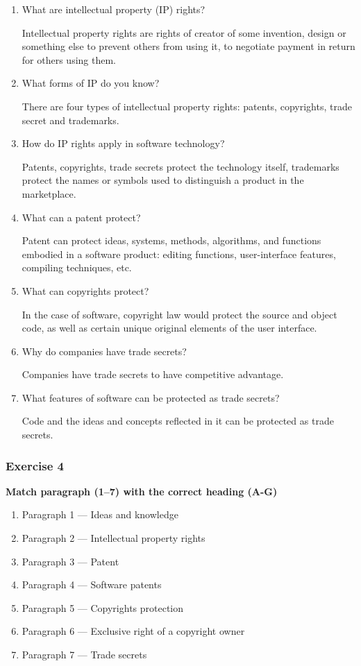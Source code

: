 \documentclass{article}
\begin{document}
\begin{enumerate}
    \item What are intellectual property (IP) rights?
    
    Intellectual property rights are rights of creator of some invention, design or something else to prevent others from using it, to negotiate payment in return for others using them. 
    \item What forms of IP do you know?
    
    There are four types of intellectual property rights: patents, copyrights, trade secret and trademarks.
    \item How do IP rights apply in software technology?
    
    Patents, copyrights, trade secrets protect the technology itself, trademarks protect the names or symbols used to distinguish a product in the marketplace.
    \item What can a patent protect?
    
    Patent can protect ideas, systems, methods, algorithms, and functions embodied in a software product: editing functions, user-interface features, compiling techniques, etc.
    \item What can copyrights protect?
    
    In the case of software, copyright law would protect the source and object code, as well as certain unique original elements of the user interface.
    \item Why do companies have trade secrets?

    Companies have trade secrets to have competitive advantage.
    \item What features of software can be protected as trade secrets?
    
    Code and the ideas and concepts reflected in it can be protected as trade secrets.
\end{enumerate}

\subsubsection{Exercise 4}

\textbf{Match paragraph (1–7) with the correct heading (A-G)}

\begin{multicols}{2}
\begin{enumerate}
    \item Paragraph 1 — Ideas and knowledge
    \item Paragraph 2 — Intellectual property rights
    \item Paragraph 3 — Patent
    \item Paragraph 4 — Software patents
    \item Paragraph 5 — Copyrights protection
    \item Paragraph 6 — Exclusive right of a copyright owner
    \item Paragraph 7 — Trade secrets
\end{enumerate}
\end{multicols}
\end{document}

